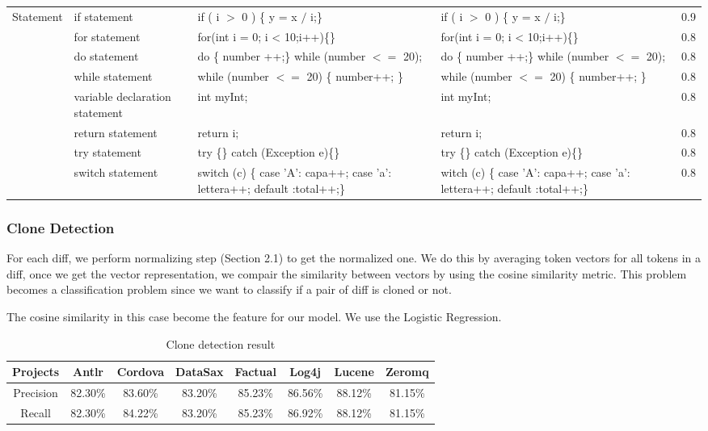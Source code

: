 \begin{table}
\begin{tabular}{p{2cm}|l|p{5cm}|p{5cm}|p{1cm}}
		\hline
		Statement & if statement & if ( i $>$ 0 ) \{ y = x $/$ i;\} & if ( i $>$ 0 ) \{ y = x $/$ i;\} & 0.9 \\\cline{2-5}
		& for statement & for(int i = 0; i < 10;i++)\{\} & for(int i = 0; i < 10;i++)\{\} & 0.8\\\cline{2-5}
		& do statement & do \{ number ++;\} while (number $<=$ 20); & do \{ number ++;\} while (number $<=$ 20);  & 0.8\\\cline{2-5}
		& while statement & while (number $<=$ 20) \{ number++; \} & while (number $<=$ 20) \{ number++; \}  & 0.8\\\cline{2-5}
		& variable declaration statement & int myInt; & int myInt; & 0.8\\\cline{2-5}
		& return statement & return i; & return i;  & 0.8\\\cline{2-5}
		& try statement & try \{\} catch (Exception e)\{\} & try \{\} catch (Exception e)\{\}  & 0.8\\\cline{2-5}
		& switch statement & switch (c) \{ case 'A': capa++; case 'a': lettera++; default :total++;\} & witch (c) \{ case 'A': capa++; case 'a': lettera++; default :total++;\}  & 0.8\\\cline{2-5}
	\end{tabular}
\end{table}

\subsubsection{Clone Detection}
For each diff, we perform normalizing step (Section 2.1) to get the normalized one. We do this by averaging token vectors for all tokens in a diff, once we get the vector representation, we compair the similarity between vectors by using the cosine similarity metric. This problem becomes a classification problem since we want to classify if a pair of diff is cloned or not.

The cosine similarity in this case become the feature for our model. We use the Logistic Regression.

\begin{table}
	\caption{Clone detection result}
	\label{tab:freq}
	
	\begin{tabular}{c|ccccccc}
		
		\hline
		Projects&Antlr&Cordova &DataSax&Factual&Log4j&	Lucene&	Zeromq\\
		\hline
		Precision&	82.30\% &	83.60\%&	83.20\%&	85.23\%&	86.56\%&	88.12\%&	81.15\%\\
		Recall&	82.30\%&	84.22\%&	83.20\%&	85.23\%&	86.92\%&	88.12\%&	81.15\%\\
		\hline
	\end{tabular}
\end{table}

